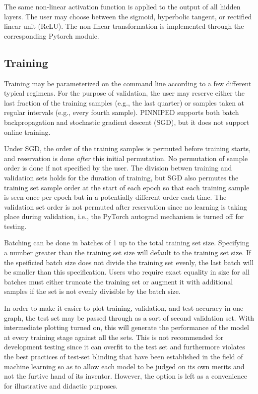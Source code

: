 \documentclass[10pt,epsf]{article}
\begin{document}
{{    The same non-linear activation function is applied to the output of all hidden layers. The user
    may choose between the sigmoid, hyperbolic tangent, or rectified linear unit (ReLU). The non-linear
    transformation is implemented through the corresponding Pytorch module.
  }

  \subsection{Training}{
    Training may be parameterized on the command line according to a few different typical regimens.
    For the purpose of validation, the user may reserve either the last fraction of the training samples
    (e.g., the last quarter) or samples taken at regular intervals (e.g., every fourth sample).
    PINNIPED supports both batch backpropagation and stochastic gradient descent (SGD), but it does not
    support online training.

    Under SGD, the order of the training samples is permuted before training starts\autocite{torchshuffle},
    and reservation is done \emph{after} this initial permutation. No permutation of sample order is done
    if not specified by the user. The division betwen training and validation sets holds for the duration
    of training, but SGD also permutes the training set sample order at the start of each epoch so that
    each training sample is seen once per epoch but in a potentially different order each time.
    The validation set order is not permuted after reservation since no learning is taking place during
    validation, i.e., the PyTorch autograd mechanism is turned off for testing.

    Batching can be done in batches of 1 up to the total training set size. Specifying a number greater
    than the training set size will default to the training set size. If the speificied batch size does
    not divide the training set evenly, the last batch will be smaller than this specification. Users who
    require exact equality in size for all batches must either truncate the training set or augment it
    with additional samples if the set is not evenly divisible by the batch size.

    In order to make it easier to plot training, validation, and test accuracy in
    one graph, the test set may be passed through as a sort of second validation set. With intermediate
    plotting turned on, this will generate the performance of the model at every training stage against
    all the sets. This is not recommended for development testing since it can overfit to the
    test set and furthermore violates the best practices of test-set blinding that have been established
    in the field of machine learning so as to allow each model to be judged on its own merits and not the furtive
    hand of its inventor. However, the option is left as a convenience for illustrative and didactic purposes.
  }
}
\end{document}

